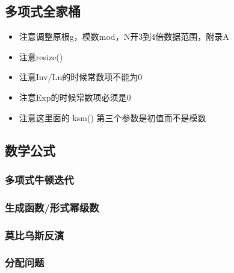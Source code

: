 


\subsection{多项式全家桶}
\begin{itemize}
    \item 注意调整原根g，模数mod，N开3到4倍数据范围，附录A
    \item 注意resize()
    \item 注意Inv/Ln的时候常数项不能为0
    \item 注意Exp的时候常数项必须是0
    \item 注意这里面的 ksm() 第三个参数是初值而不是模数
\end{itemize}


\subsection{数学公式}

\subsubsection{多项式牛顿迭代}


\subsubsection{生成函数/形式幂级数}

\subsubsection{莫比乌斯反演}

\subsubsection{分配问题}

